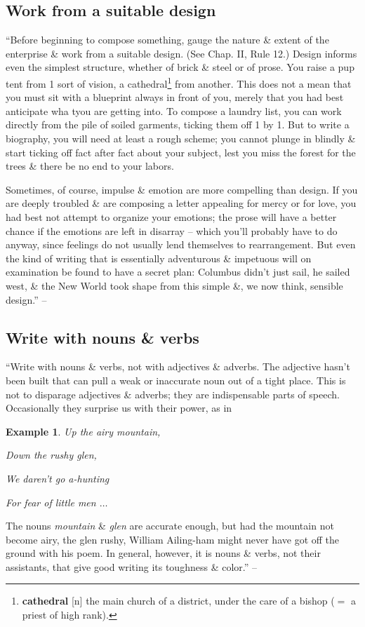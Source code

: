\documentclass[oneside]{book}
\numberwithin{equation}{section}
\newtheorem{example}{Example}[chapter]
\begin{document}
\subsection{Work from a suitable design}
``Before beginning to compose something, gauge the nature \& extent of the enterprise \& work from a suitable design. (See Chap. II, Rule 12.) Design informs even the simplest structure, whether of brick \& steel or of prose. You raise a pup tent from 1 sort of vision, a cathedral\footnote{\textbf{cathedral} [n] the main church of a district, under the care of a bishop ($=$ a priest of high rank).} from another. This does not a mean that you must sit with a blueprint always in front of you, merely that you had best anticipate wha tyou are getting into. To compose a laundry list, you can work directly from the pile of soiled garments, ticking them off 1 by 1. But to write a biography, you will need at least a rough scheme; you cannot plunge in blindly \& start ticking off fact after fact about your subject, lest you miss the forest for the trees \& there be no end to your labors.

Sometimes, of course, impulse \& emotion are more compelling than design. If you are deeply troubled \& are composing a letter appealing for mercy or for love, you had best not attempt to organize your emotions; the prose will have a better chance if the emotions are left in disarray -- which you'll probably have to do anyway, since feelings do not usually lend themselves to rearrangement. But even the kind of writing that is essentially adventurous \& impetuous will on examination be found to have a secret plan: Columbus didn't just sail, he sailed west, \& the New World took shape from this simple \&, we now think, sensible design.'' -- \cite[Chap. 5, Sect. 3, p. 80]{Strunk_White2019}

\subsection{Write with nouns \& verbs}
``Write with nouns \& verbs, not with adjectives \& adverbs. The adjective hasn't been built that can pull a weak or inaccurate noun out of a tight place. This is not to disparage adjectives \& adverbs; they are indispensable parts of speech. Occasionally they surprise us with their power, as in

\begin{example}
	Up the airy mountain,
	
	Down the rushy glen,
	
	We daren't go a-hunting
	
	For fear of little men $\ldots$
\end{example}
The nouns \textit{mountain} \& \textit{glen} are accurate enough, but had the mountain not become airy, the glen rushy, William Ailing-ham might never have got off the ground with his poem. In general, however, it is nouns \& verbs, not their assistants, that give good writing its toughness \& color.'' -- \cite[Chap. 5, Sect. 4, p. 81]{Strunk_White2019}
\end{document}
